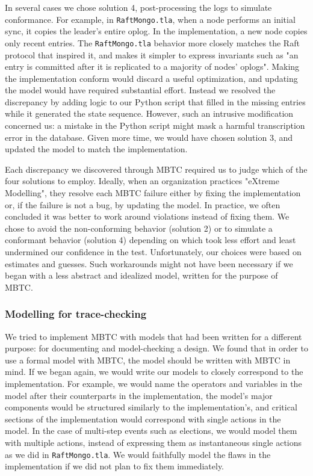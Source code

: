 \documentclass{vldb}
\begin{document}
In several cases we chose solution 4, post-processing the logs to simulate conformance. For example, in \texttt{RaftMongo.tla}, when a node performs an initial sync, it copies the leader's entire oplog.
In the implementation, a new node copies only recent entries.
The \texttt{RaftMongo.tla} behavior more closely matches the Raft protocol that inspired it, and makes it simpler to express invariants such as "an entry is committed after it is replicated to a majority of nodes' oplogs".
Making the implementation conform would discard a useful optimization, and updating the model would have required substantial effort.
Instead we resolved the discrepancy by adding logic to our Python script that filled in the missing entries while it generated the state sequence.
However, such an intrusive modification concerned us: a mistake in the Python script might mask a harmful transcription error in the database.
Given more time, we would have chosen solution 3, and updated the model to match the implementation.

Each discrepancy we discovered through MBTC required us to judge which of the four solutions to employ. 
Ideally, when an organization practices "eXtreme Modelling", they resolve each MBTC failure either by fixing the implementation or, if the failure is not a bug, by updating the model.
In practice, we often concluded it was better to work around violations instead of fixing them.
We chose to avoid the non-conforming behavior (solution 2) or to simulate a conformant behavior (solution 4) depending on which took less effort and least undermined our confidence in the test.
Unfortunately, our choices were based on estimates and guesses.
Such workarounds might not have been necessary if we began with a less abstract and idealized model, written for the purpose of MBTC.

\subsubsection{Modelling for trace-checking}
\label{subsubsec:modelling_for_trace_checking}

We tried to implement MBTC with models that had been written for a different purpose: for documenting and model-checking a design. 
We found that in order to use a formal model with MBTC, the model should be written with MBTC in mind.
If we began again, we would write our models to closely correspond to the implementation.
For example, we would name the operators and variables in the model after their counterparts in the implementation, the model's major components would be structured similarly to the implementation's, and critical sections of the implementation would correspond with single actions in the model.
In the case of multi-step events such as elections, we would model them with multiple actions, instead of expressing them as instantaneous single actions as we did in \texttt{RaftMongo.tla}.
We would faithfully model the flaws in the implementation if we did not plan to fix them immediately.
\end{document}
